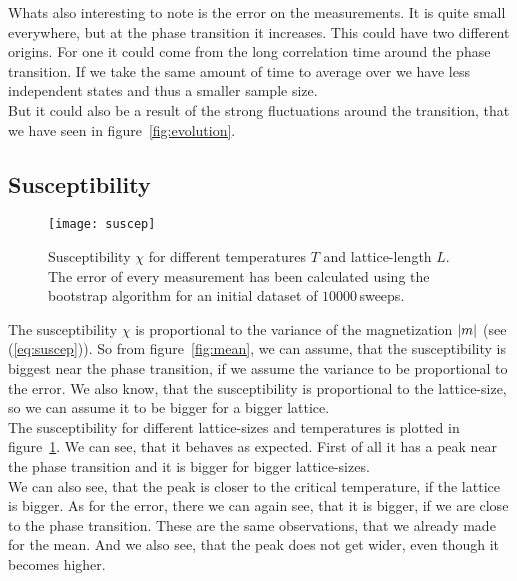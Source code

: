 Whats also interesting to note is the error on the measurements. It is quite small everywhere, but at the phase transition it increases. This could have two different origins. For one it could come from the long correlation time around the phase transition. If we take the same amount of time to average over we have less independent states and thus a smaller sample size.\\
But it could also be a result of the strong fluctuations around the transition, that we have seen in figure~\ref{fig:evolution}.


\subsection{Susceptibility}

\begin{figure}
  \centering
  \texttt{[image: suscep]}
  \caption{Susceptibility $\chi$ for different temperatures $T$ and lattice-length $L$. The error of every measurement has been calculated using the bootstrap algorithm for an initial dataset of $10000\,$sweeps.}\label{fig:suscep}
\end{figure}

The susceptibility $\chi$ is proportional to the variance of the magnetization $\left\vert m \right\vert$ (see (\ref{eq:suscep})). So from figure~\ref{fig:mean}, we can assume, that the susceptibility is biggest near the phase transition, if we assume the variance to be proportional to the error. We also know, that the susceptibility is proportional to the lattice-size, so we can assume it to be bigger for a bigger lattice.\\
The susceptibility for different lattice-sizes and temperatures is plotted in figure~\ref{fig:suscep}. We can see, that it behaves as expected. First of all it has a peak near the phase transition and it is bigger for bigger lattice-sizes.\\
We can also see, that the peak is closer to the critical temperature, if the lattice is bigger. As for the error, there we can again see, that it is bigger, if we are close to the phase transition. These are the same observations, that we already made for the mean. And we also see, that the peak does not get wider, even though it becomes higher.


